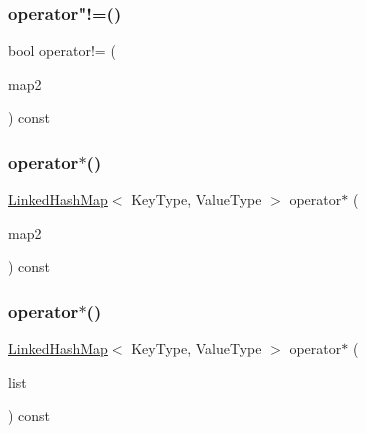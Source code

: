 \mbox{\label{classLinkedHashMap_a9be7cc7d3dd06f289feea87f28b49002}} 
\subsubsection{\texorpdfstring{operator"!=()}{operator!=()}}
{\footnotesize\ttfamily bool operator!= (\begin{DoxyParamCaption}\item[{const \mbox{\hyperlink{classLinkedHashMap}{Linked\+Hash\+Map}}$<$ Key\+Type, Value\+Type $>$ \&}]{map2 }\end{DoxyParamCaption}) const}

\mbox{\label{classLinkedHashMap_a61b6a214c4265ae95067eb98e76b2009}} 
\subsubsection{\texorpdfstring{operator$\ast$()}{operator*()}\hspace{0.1cm}{\footnotesize\ttfamily [1/2]}}
{\footnotesize\ttfamily \mbox{\hyperlink{classLinkedHashMap}{Linked\+Hash\+Map}}$<$ Key\+Type, Value\+Type $>$ operator$\ast$ (\begin{DoxyParamCaption}\item[{const \mbox{\hyperlink{classLinkedHashMap}{Linked\+Hash\+Map}}$<$ Key\+Type, Value\+Type $>$ \&}]{map2 }\end{DoxyParamCaption}) const}

\mbox{\label{classLinkedHashMap_a84194e9735d5407828399ef5ed99c77e}} 
\subsubsection{\texorpdfstring{operator$\ast$()}{operator*()}\hspace{0.1cm}{\footnotesize\ttfamily [2/2]}}
{\footnotesize\ttfamily \mbox{\hyperlink{classLinkedHashMap}{Linked\+Hash\+Map}}$<$ Key\+Type, Value\+Type $>$ operator$\ast$ (\begin{DoxyParamCaption}\item[{std\+::initializer\+\_\+list$<$ std\+::pair$<$ Key\+Type, Value\+Type $>$ $>$}]{list }\end{DoxyParamCaption}) const}

